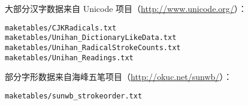 \documentclass[UTF8,hyperref,nofonts]{ctexart}
\begin{document}
大部分汉字数据来自 Unicode 项目（\url{http://www.unicode.org/}）：
\begin{verbatim}
maketables/CJKRadicals.txt
maketables/Unihan_DictionaryLikeData.txt
maketables/Unihan_RadicalStrokeCounts.txt
maketables/Unihan_Readings.txt
\end{verbatim}

部分字形数据来自海峰五笔项目（\url{http://okuc.net/sunwb/}）：
\begin{verbatim}
maketables/sunwb_strokeorder.txt
\end{verbatim}



\printindex
\end{document}
